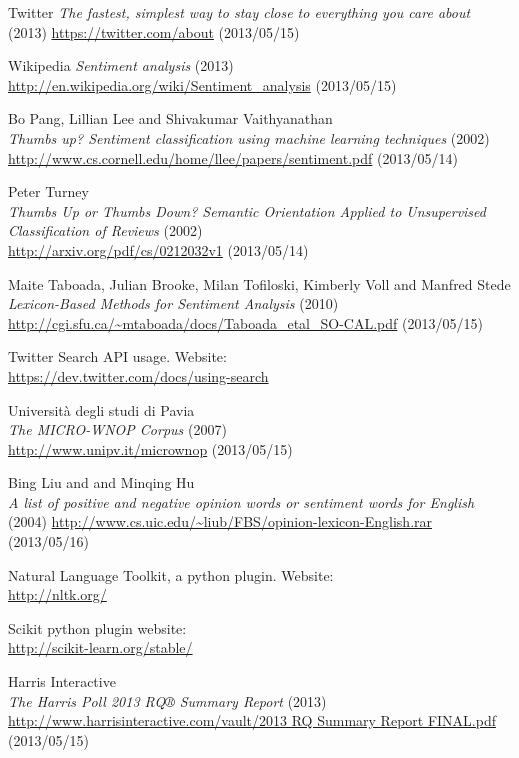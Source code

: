 \documentclass[a4paper,12pt]{report}
\begin{document}
\begin{thebibliography}{12}

\vspace{-1cm}
  Twitter
  \emph{The fastest, simplest way to stay close to everything you care about} (2013)
  \url{https://twitter.com/about} (2013/05/15)

  Wikipedia
  \emph{Sentiment analysis} (2013)
  \url{http://en.wikipedia.org/wiki/Sentiment_analysis} (2013/05/15)

  Bo Pang, Lillian Lee and Shivakumar Vaithyanathan\\
  \emph{Thumbs up? Sentiment classification using machine learning techniques} (2002)\\
  \url{http://www.cs.cornell.edu/home/llee/papers/sentiment.pdf} (2013/05/14)

  Peter Turney\\
  \emph{Thumbs Up or Thumbs Down? Semantic Orientation Applied to Unsupervised Classification of Reviews} (2002)\\
  \url{http://arxiv.org/pdf/cs/0212032v1} (2013/05/14)

  Maite Taboada, Julian Brooke, Milan Tofiloski, Kimberly Voll and Manfred Stede\\
  \emph{Lexicon-Based Methods for Sentiment Analysis} (2010)\\
  \url{http://cgi.sfu.ca/~mtaboada/docs/Taboada_etal_SO-CAL.pdf} (2013/05/15)

  Twitter Search API usage. Website:\\
  \url{https://dev.twitter.com/docs/using-search}

  Università degli studi di Pavia\\
  \emph{The MICRO-WNOP Corpus} (2007)\\
  \url{http://www.unipv.it/micrownop} (2013/05/15)
  
  Bing Liu and and Minqing Hu\\
  \emph{A list of positive and negative opinion words or sentiment words for English} (2004)
  \url{http://www.cs.uic.edu/~liub/FBS/opinion-lexicon-English.rar} (2013/05/16)

  Natural Language Toolkit, a python plugin. Website:\\
  \url{http://nltk.org/}
  
  Scikit python plugin website:\\
  \url{http://scikit-learn.org/stable/}

  Harris Interactive\\
  \emph{The Harris Poll 2013 RQ® Summary Report} (2013)\\
  \url{http://www.harrisinteractive.com/vault/2013 RQ Summary Report FINAL.pdf} (2013/05/15)

\end{thebibliography}
\end{document}

